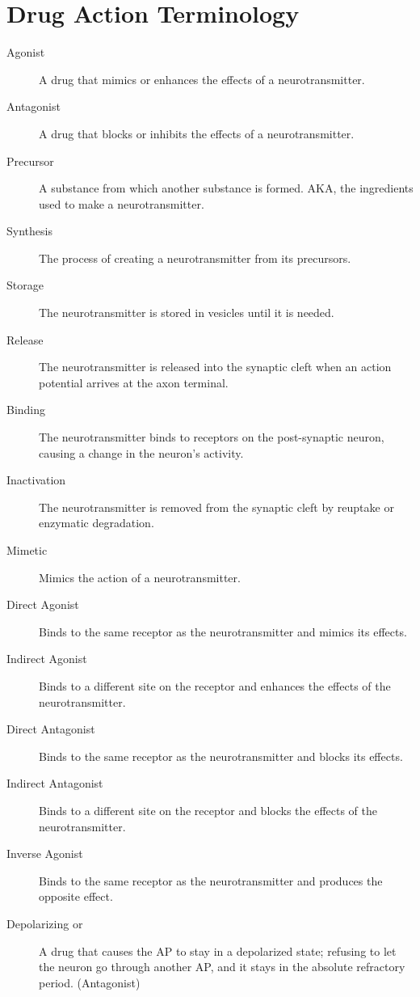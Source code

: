 \section*{Drug Action Terminology}
\begin{description}
    \item[Agonist] A drug that mimics or enhances the effects of a neurotransmitter.
    \item[Antagonist] A drug that blocks or inhibits the effects of a neurotransmitter.
    \item[Precursor] A substance from which another substance is formed. AKA, the ingredients used to make a neurotransmitter.
    \item[Synthesis] The process of creating a neurotransmitter from its precursors.
    \item[Storage] The neurotransmitter is stored in vesicles until it is needed.
    \item[Release] The neurotransmitter is released into the synaptic cleft when an action potential arrives at the axon terminal.
    \item[Binding] The neurotransmitter binds to receptors on the post-synaptic neuron, causing a change in the neuron's activity.
    \item[Inactivation] The neurotransmitter is removed from the synaptic cleft by reuptake or enzymatic degradation.
    \item[Mimetic] Mimics the action of a neurotransmitter.
    \item[Direct Agonist] Binds to the same receptor as the neurotransmitter and mimics its effects.
    \item[Indirect Agonist] Binds to a different site on the receptor and enhances the effects of the neurotransmitter.
    \item[Direct Antagonist] Binds to the same receptor as the neurotransmitter and blocks its effects.
    \item[Indirect Antagonist] Binds to a different site on the receptor and blocks the effects of the neurotransmitter.
    \item[Inverse Agonist] Binds to the same receptor as the neurotransmitter and produces the opposite effect.
    \item[Depolarizing or ] A drug that causes the AP to stay in a depolarized state; refusing to let the neuron go through another AP, and it stays in the absolute refractory period. (Antagonist)
\end{description}

